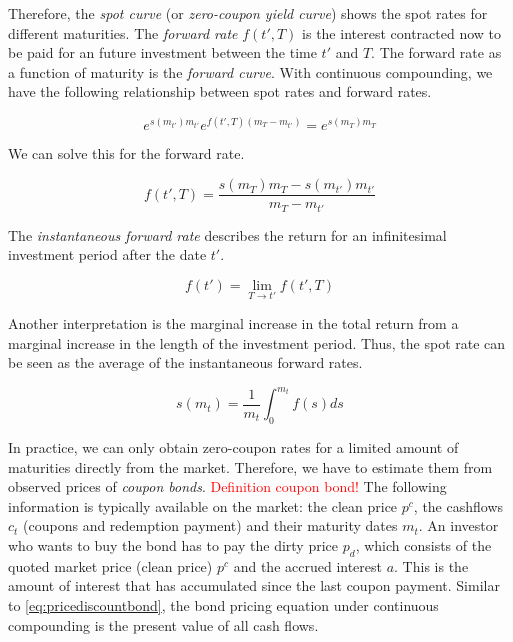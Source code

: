 Therefore, the \emph{spot curve} (or \emph{zero-coupon yield curve}) shows the spot rates for different maturities. The \emph{forward rate} $f(t',T)$ is the interest contracted now to be paid for an future investment between the time $t'$ and $T$. The forward rate as a function of maturity is the \emph{forward curve}. With continuous compounding, we have the following relationship between spot rates and forward rates.

\begin{equation*}
  \label{eq:relspotforward}
  e^{s(m_{t'}) m_{t'}}e^{f(t',T)(m_T-m_{t'})} = e^{s(m_T) m_T}
\end{equation*}

We can solve this for the forward rate.

\begin{equation*}
  \label{eq:forwardrate}
  f(t',T) = \frac{s(m_T)m_T - s(m_{t'})m_{t'}}{m_T-m_{t'}}
\end{equation*}

The \emph{instantaneous forward rate} describes the return for an infinitesimal investment period after the date $t'$.

\begin{equation*}
  \label{eq:instforw}
  f(t') = \lim_{T\rightarrow t'}f(t',T)
\end{equation*}

Another interpretation is the marginal increase in the total return from a marginal increase in the length of the investment period. Thus, the spot rate can be seen as the average of the instantaneous forward rates.

\begin{equation}
  \label{eq:avgforwardrate}
  s(m_t)=\frac{1}{m_t}\int_0^{m_t}f(s)ds
\end{equation}

In practice, we can only obtain zero-coupon rates for a limited amount of maturities directly from the market. Therefore, we have to estimate them from observed prices of \emph{coupon bonds}. \textcolor{red}{Definition coupon bond!} The following information is typically available on the market: the clean price $p^c$, the cashflows $c_t$ (coupons and redemption payment) and their maturity dates $m_t$. An investor who wants to buy the bond has to pay the dirty price $p_d$, which consists of the quoted market price (clean price) $p^c$ and the accrued interest $a$. This is the amount of interest that has accumulated since the last coupon payment. Similar to \eqref{eq:pricediscountbond}, the bond pricing equation under continuous compounding is the present value of all cash flows.

